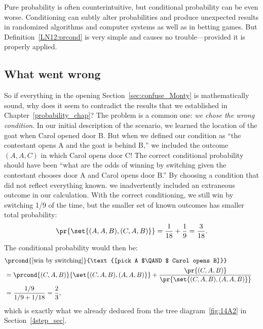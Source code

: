 Pure probability is often counterintuitive, but conditional
probability can be even worse.  Conditioning can subtly alter
probabilities and produce unexpected results in randomized algorithms
and computer systems as well as in betting games.  But Definition~\ref{LN12:prcond} is
very simple and causes no trouble---provided it is properly applied.

\subsection{What went wrong}

So if everything in the opening Section~\ref{sec:confuse_Monty} is
mathematically sound, why does it seem to contradict the results that
we established in Chapter~\ref{probability_chap}?  The problem is a
common one: \emph{we chose the wrong condition}.  In our initial
description of the scenario, we learned the location of the goat when
Carol opened door B.  But when we defined our condition as ``the
contestant opens A and the goat is behind B,'' we included the outcome
$(A, A, C)$ in which Carol opens door C!  The correct conditional
probability should have been ``what are the odds of winning by
switching given the contestant chooses door A and Carol opens door
B.''  By choosing a condition that did not reflect everything known.
we inadvertently included an extraneous outcome in our calculation.
With the correct conditioning, we still win by switching 1/9 of the
time, but the smaller set of known outcomes has smaller total
probability:
\[
\pr{\set{(A, A, B),(C, A, B)}} = \frac{1}{18} + \frac{1}{9} = \frac{3}{18}.
\]
The conditional probability would then be:
\begin{align*}
\lefteqn{\prcond{\text{[win by switching]}}{\text{[pick A $\QAND$ Carol opens B]}}}\\
 & = \prcond{(C, A, B)}{\set{(C, A, B),(A, A, B)}}
          + \frac{\pr{(C, A, B)}}{\pr{\set{(C, A, B),(A, A, B)}}}\\
 & = \frac{1/9}{1/9 + 1/18} =  \frac{2}{3},
\end{align*}
which is exactly what we already deduced from the tree
diagram~\ref{fig:14A2} in Section~\ref{4step_sec}.

